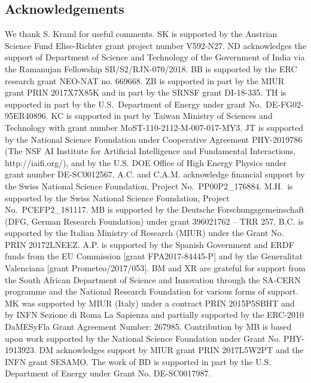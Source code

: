 \documentclass[10pt]{article}
\begin{document}
\subsection*{Acknowledgements}
We thank S. Kraml for useful comments. SK is supported by the Austrian Science Fund Elise-Richter grant project number V592-N27. 
%
ND acknowledges the support of Department of Science and Technology of the Government of India via the Ramanujan Fellowship SB/S2/RJN-070/2018.
%
BB is supported by the ERC research grant NEO-NAT no. 669668.
%
ZB is supported in part by the MIUR grant PRIN 2017X7X85K 
and in part by the SRNSF grant DI-18-335. 
% 
TH is supported in part by the U.S.~Department of Energy under grant No.~DE-FG02-95ER40896. 
KC is supported in part by Taiwan Ministry of Sciences and Technology with grant number MoST-110-2112-M-007-017-MY3.
%
JT is supported by the National Science Foundation under Cooperative Agreement PHY-2019786 (The NSF AI Institute for Artificial Intelligence and Fundamental Interactions, http://iaifi.org/), and by the U.S. DOE Office of High Energy Physics under grant number DE-SC0012567.
%
A.C. and C.A.M. acknowledge financial support by the Swiss National Science Foundation, Project No.\ PP00P2\_176884.
%
M.H.\ is supported by the Swiss National Science Foundation, Project No.\ PCEFP2\_181117.
%
MB is supported by the Deutsche Forschungsgemeinschaft (DFG, German Research Foundation) under grant  396021762 -- TRR 257.
%
B.C. is supported by the Italian Ministry of Research (MIUR) under the Grant No. PRIN 20172LNEEZ.
%
A.P. is supported by the Spanish Government and ERDF funds from the EU Commission [grant FPA2017-84445-P] and by the Generalitat Valenciana [grant Prometeo/2017/053].
%
BM and XR are grateful for support from the South African Department of Science and Innovation through the SA-CERN programme and the National Research Foundation for various forms of support.
%
MK was supported by MIUR (Italy) under a contract PRIN 2015P5SBHT and by INFN Sezione di Roma La Sapienza and partially supported by the ERC-2010 DaMESyFla Grant Agreement Number: 267985.
%
Contribution by MB is based upon work supported by the National Science Foundation under Grant No. PHY-1913923.
%
DM acknowledges support by MIUR grant PRIN 2017L5W2PT and the INFN grant SESAMO.
%
The work of BD is supported in part by the U.S. Department of Energy under Grant No. DE-SC0017987.



\end{document}
